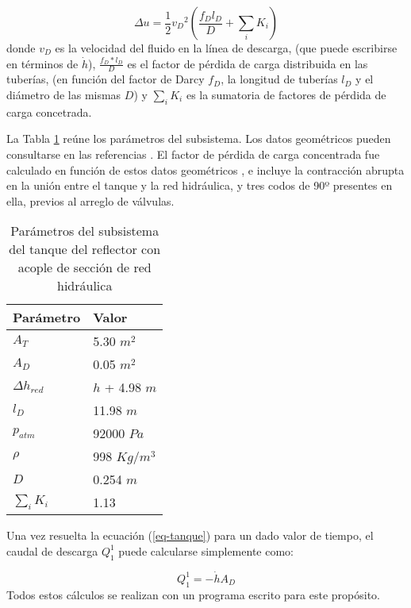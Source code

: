\begin{equation}
\Delta u = \frac {1} {2} {v_D}^2 \left( \frac {f_D l_D}{D} + \sum_i K_i \right)
\end{equation}
donde $v_D$ es la velocidad del fluido en la línea de descarga,
(que puede escribirse en términos de $\dot{h}$),
$\frac {f_D*l_D}{D}$ es el factor de pérdida de carga distribuida en las tuberías,
(en función del factor de Darcy $f_D$, la longitud de tuberías $l_D$ y el diámetro de las mismas $D$)
y $\sum_i K_i$ es la sumatoria de factores de pérdida de carga concetrada.

La Tabla \ref{tabla-tanque} reúne los parámetros del subsistema.
Los datos geométricos pueden consultarse en las referencias \cite{invap-mockup}.
El factor de pérdida de carga concentrada fue calculado en función de estos datos geométricos \cite{iedelchik},
e incluye la contracción abrupta en la unión entre el tanque y la red hidráulica,
y tres codos de 90º presentes en ella, previos al arreglo de válvulas.

\begin{table}[]
\centering
\begin{tabular}{|l|l|}
\hline
Parámetro        & Valor          \\ \hline
$A_T$            & 5.30 $m^2$     \\ \hline
$A_D$            & 0.05 $m^2$     \\ \hline
$\Delta h_{red}$ & $h$ + 4.98 $m$ \\ \hline
$l_D$            & 11.98 $m$      \\ \hline
$p_{atm}$        & 92000 $Pa$     \\ \hline
$\rho$           & 998 $Kg/m^3$   \\ \hline
$D$              & 0.254 $m$      \\ \hline
$\sum_i K_i$     & 1.13           \\ \hline
\end{tabular}
\caption{Parámetros del subsistema del tanque del reflector con acople de sección de red hidráulica}
\label{tabla-tanque}
\end{table}

Una vez resuelta la ecuación (\ref{eq-tanque}) para un dado valor de tiempo,
el caudal de descarga $Q_1^1$ puede calcularse simplemente como:

\begin{equation}
Q_1^1 = -\dot{h} A_D
\label{eq-qd}
\end{equation}
Todos estos cálculos se realizan con un programa escrito para este propósito.

